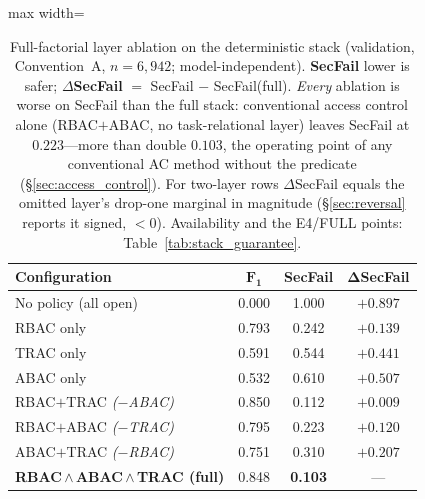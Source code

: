 \documentclass[sigconf,review,anonymous]{acmart}
\begin{document}
\begin{table}[!t]
\centering
\caption{Full-factorial layer ablation on the deterministic stack (validation, Convention~A, $n=6{,}942$; model-independent). \textbf{SecFail} lower is safer; \textbf{$\Delta$SecFail} $=$ SecFail $-$ SecFail(full). \emph{Every} ablation is worse on SecFail than the full stack: conventional access control alone (RBAC$+$ABAC, no task-relational layer) leaves SecFail at $0.223$---more than double $0.103$, the operating point of any conventional AC method without the predicate (\S\ref{sec:access_control}). For two-layer rows $\Delta$SecFail equals the omitted layer's drop-one marginal in magnitude (\S\ref{sec:reversal} reports it signed, $<\!0$). Availability and the E4/FULL points: Table~\ref{tab:stack_guarantee}.}
\label{tab:factorial_ablation}
\footnotesize
\setlength{\tabcolsep}{6pt}
\begin{adjustbox}{max width=\columnwidth}
\begin{tabular}{@{}lccc@{}}
\toprule
\textbf{Configuration} & $\mathbf{F_1}$ & \textbf{SecFail} & $\mathbf{\Delta}$\textbf{SecFail} \\
\midrule
No policy (all open)             & 0.000 & 1.000 & $+0.897$ \\
\addlinespace[2pt]
RBAC only                        & 0.793 & 0.242 & $+0.139$ \\
TRAC only                        & 0.591 & 0.544 & $+0.441$ \\
ABAC only                        & 0.532 & 0.610 & $+0.507$ \\
\addlinespace[2pt]
RBAC$+$TRAC \textit{($-$ABAC)}   & 0.850 & 0.112 & $+0.009$ \\
RBAC$+$ABAC \textit{($-$TRAC)}   & 0.795 & 0.223 & $+0.120$ \\
ABAC$+$TRAC \textit{($-$RBAC)}   & 0.751 & 0.310 & $+0.207$ \\
\midrule
\textbf{RBAC\,$\wedge$\,ABAC\,$\wedge$\,TRAC (full)} & 0.848 & \textbf{0.103} & --- \\
\bottomrule
\end{tabular}
\end{adjustbox}
\end{table}
\end{document}
